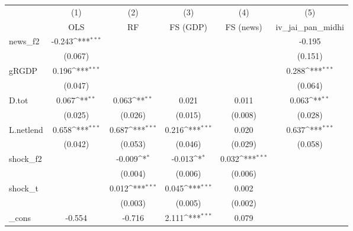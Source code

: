 {
\def\sym#1{\ifmmode^{#1}\else\(^{#1}\)\fi}
\begin{tabular}{l*{5}{c}}
\toprule
            &\multicolumn{1}{c}{(1)}&\multicolumn{1}{c}{(2)}&\multicolumn{1}{c}{(3)}&\multicolumn{1}{c}{(4)}&\multicolumn{1}{c}{(5)}\\
            &\multicolumn{1}{c}{OLS}&\multicolumn{1}{c}{RF}&\multicolumn{1}{c}{FS (GDP)}&\multicolumn{1}{c}{FS (news)}&\multicolumn{1}{c}{iv\_jai\_pan\_midhi}\\
\midrule
news\_f2     &      -0.243\sym{***}&                     &                     &                     &      -0.195         \\
            &     (0.067)         &                     &                     &                     &     (0.151)         \\
\addlinespace
gRGDP       &       0.196\sym{***}&                     &                     &                     &       0.288\sym{***}\\
            &     (0.047)         &                     &                     &                     &     (0.064)         \\
\addlinespace
D.tot       &       0.067\sym{**} &       0.063\sym{**} &       0.021         &       0.011         &       0.063\sym{**} \\
            &     (0.025)         &     (0.026)         &     (0.015)         &     (0.008)         &     (0.028)         \\
\addlinespace
L.netlend   &       0.658\sym{***}&       0.687\sym{***}&       0.216\sym{***}&       0.020         &       0.637\sym{***}\\
            &     (0.042)         &     (0.053)         &     (0.046)         &     (0.029)         &     (0.058)         \\
\addlinespace
shock\_f2    &                     &      -0.009\sym{*}  &      -0.013\sym{*}  &       0.032\sym{***}&                     \\
            &                     &     (0.004)         &     (0.006)         &     (0.006)         &                     \\
\addlinespace
shock\_t     &                     &       0.012\sym{***}&       0.045\sym{***}&       0.002         &                     \\
            &                     &     (0.003)         &     (0.005)         &     (0.002)         &                     \\
\addlinespace
\_cons      &      -0.554         &      -0.716         &       2.111\sym{***}&       0.079         &                     \\

\end{tabular}}
